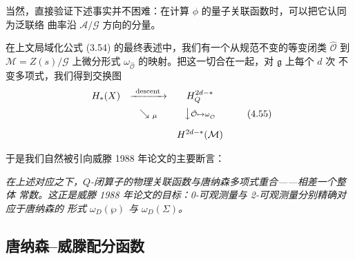 当然，直接验证下述事实并不困难：在计算 $\phi$ 的量子关联函数时，可以把它认同为泛联络
曲率沿 $\mathcal{A}/\mathcal{G}$ 方向的分量。

在上文局域化公式 (3.54) 的最终表述中，我们有一个从规范不变的等变闭类
$\hat{\mathcal{O}}$ 到 $\mathcal{M}=Z(s)/\mathcal{G}$ 上微分形式
$\omega_{\hat{\mathcal{O}}}$ 的映射。把这一切合在一起，对 $\mathfrak{g}$ 上每个 $d$ 次
不变多项式，我们得到交换图
\begin{equation}
  \begin{array}{ccc}
    H_{*}(X) & \xrightarrow{\ \mathrm{descent}\ } & H^{2d-*}_{Q}\\[6pt]
     & \searrow_{\ \mu} & \big\downarrow{\scriptstyle
       \hat{\mathcal{O}}\mapsto\omega_{\hat{\mathcal{O}}}}\\[10pt]
     & & H^{2d-*}(\mathcal{M})
  \end{array}
  \tag{4.55}
\end{equation}

于是我们自然被引向威滕 1988 年论文的主要断言：

\begin{center}
\itshape 在上述对应之下，$Q$-闭算子的物理关联函数与唐纳森多项式重合——相差一个整体
常数。这正是威滕 1988 年论文的目标：0-可观测量与 2-可观测量分别精确对应于唐纳森的
形式 $\omega_{D}(\wp)$ 与 $\omega_{D}(\Sigma)$。
\end{center}


\subsection{唐纳森--威滕配分函数}
\label{sec:4-6}

